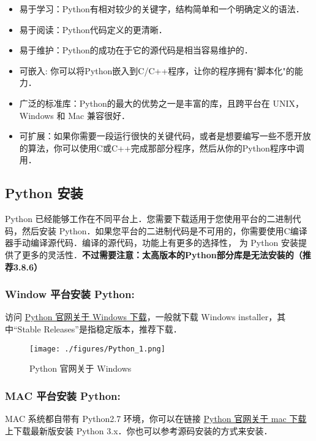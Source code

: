 \begin{itemize}
\item 易于学习：Python有相对较少的关键字，结构简单和一个明确定义的语法．
\item 易于阅读：Python代码定义的更清晰．
\item 易于维护：Python的成功在于它的源代码是相当容易维护的．
\item 可嵌入: 你可以将Python嵌入到C/C++程序，让你的程序拥有"脚本化"的能力．
\item 广泛的标准库：Python的最大的优势之一是丰富的库，且跨平台在 UNIX，Windows 和 Mac 兼容很好．
\item 可扩展：如果你需要一段运行很快的关键代码，或者是想要编写一些不愿开放的算法，你可以使用C或C++完成那部分程序，然后从你的Python程序中调用．
\end{itemize}


\subsection{Python 安装}\label{Python_sub2}
Python 已经能够工作在不同平台上．您需要下载适用于您使用平台的二进制代码，然后安装 Python．如果您平台的二进制代码是不可用的，你需要使用C编译器手动编译源代码．编译的源代码，功能上有更多的选择性， 为 Python 安装提供了更多的灵活性．\textbf{不过需要注意：太高版本的Python部分库是无法安装的（推荐3.8.6）}

\subsubsection{Window 平台安装 Python:}
访问 \href{https://www.python.org/downloads/windows/}{Python 官网关于 Windows 下载}，一般就下载  Windows installer，其中“Stable Releases”是指稳定版本，推荐下载．
\begin{figure}[ht]
\centering
\texttt{[image: ./figures/Python\_1.png]}
\caption{Python 官网关于 Windows} \label{Python_fig1}
\end{figure}

\subsubsection{MAC 平台安装 Python:}
MAC 系统都自带有 Python2.7 环境，你可以在链接 \href{https://www.python.org/downloads/mac-osx/}{Python 官网关于 mac 下载} 上下载最新版安装 Python 3.x．你也可以参考源码安装的方式来安装．

